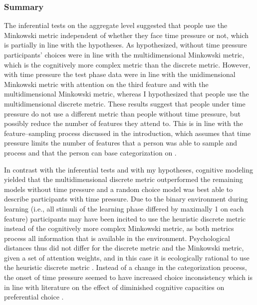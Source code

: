 \documentclass[a4paper,man,natbib]{apa6}
\begin{document}
\subsubsection{Summary}
The inferential tests on the aggregate level suggested that people use the Minkowski metric independent of whether they face time pressure or not, which is partially in line with the hypotheses. As hypothesized, without time pressure participants' choices were in line with the multidimensional Minkowski metric, which is the cognitively more complex metric than the discrete metric. However, with time pressure the test phase data were in line with the unidimensional Minkowski metric with attention on the third feature and with the multidimensional Minkowski metric, whereas I hypothesized that people use the multidimensional discrete metric. These results suggest that people under time pressure do not use a different metric than people without time pressure, but possibly reduce the number of features they attend to. This is in line with the feature--sampling process discussed in the introduction, which assumes that time pressure limits the number of features that a person was able to sample and process and that the person can base categorization on \citep{lamberts1995categorization}.  

In contrast with the inferential tests and with my hypotheses, cognitive modeling yielded that the multidimensional discrete metric outperformed the remaining models without time pressure and a random choice model was best able to describe participants with time pressure. Due to the binary environment during learning (i.e., all stimuli of the learning phase differed by maximally 1 on each feature) participants may have been incited to use the heuristic discrete metric instead of the cognitively more complex Minkowski metric, as both metrics process all information that is available in the environment. Psychological distances thus did not differ for the discrete metric and the Minkowski metric, given a set of attention weights, and in this case it is ecologically rational to use the heuristic discrete metric \citep{todd2007environments}. Instead of a change in the categorization process, the onset of time pressure seemed to have increased choice inconsistency which is in line with literature on the effect of diminished cognitive capacities on preferential choice \citep[][see also the Discussion]{olschewski2018taxing, burks2009cognitive}.
\end{document}
